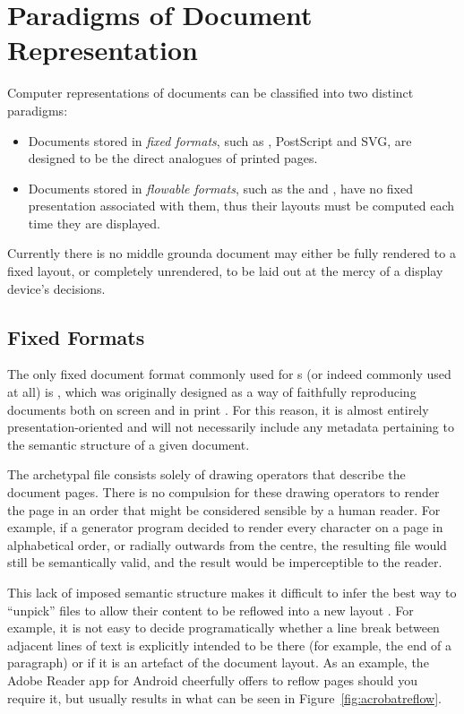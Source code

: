 \section{Paradigms of Document Representation}
Computer representations of documents can be classified into two distinct paradigms:
\begin{itemize}
 \item Documents stored in \emph{fixed formats}, such as \pdf{}, PostScript and \textsc{SVG}, are designed to be the direct analogues of printed pages.
 \item Documents stored in \emph{flowable formats}, such as the \html{} and \epub{}, have no fixed presentation associated with them, thus their layouts must be computed each time they are displayed.
\end{itemize}
Currently there is no middle ground\ed a document may either be fully rendered to a fixed layout, or completely unrendered, to be laid out at the mercy of a display device's decisions.

\subsection{Fixed Formats}
\label{sec:fixedformats}
The only fixed document format commonly used for \ebook{}s (or indeed commonly used at all) is \pdf{},\hspace{0pt}\cite{ASI2001} which was originally designed as a way of faithfully reproducing documents both on screen and in print \cite{Warnock1991}. For this reason, it is almost entirely pre\-s\-en\-ta\-tion-oriented and will not necessarily include any metadata pertaining to the semantic structure of a given document.

The archetypal \pdf{} file consists solely of drawing operators that describe the document pages. There is no compulsion for these drawing operators to render the page in an order that might be considered sensible by a human reader. For example, if a \pdf{} generator program decided to render every character on a page in alphabetical order, or radially outwards from the centre, the resulting file would still be semantically valid, and the result would be imperceptible to the reader.

This lack of imposed semantic structure makes it difficult to infer the best way to ``unpick'' \pdf{} files to allow their content to be reflowed into a new layout \cite{Lovegrove1995, Bagley2005}. For example, it is not easy to decide programatically whether a line break between adjacent lines of text is explicitly intended to be there (for example, the end of a paragraph) or if it is an artefact of the document layout. As an example, the Adobe Reader app for Android cheerfully offers to reflow \pdf{} pages should you require it, but usually results in what can be seen in Figure~\ref{fig:acrobatreflow}.

